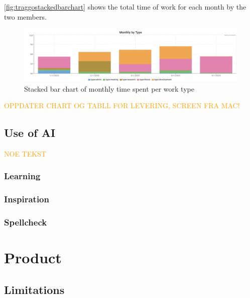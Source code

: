 \autoref{fig:traggostackedbarchart} shows the total time of work for each month by the two members.

\begin{figure}[h]
    \centering
    \includegraphics[width=1.1\linewidth]{figures/traggo_stackedbarchart.jpg}
    \caption{Stacked bar chart of monthly time spent per work type}
    \label{fig:traggostackedbarchart}
\end{figure}

\textcolor{orange}{OPPDATER CHART OG TABLL FØR LEVERING, SCREEN FRA MAC!}


\subsection{Use of AI}

\textcolor{orange}{NOE TEKST}

\subsubsection{Learning}

\subsubsection{Inspiration}

\subsubsection{Spellcheck}


\section{Product}


\subsection{Limitations}


